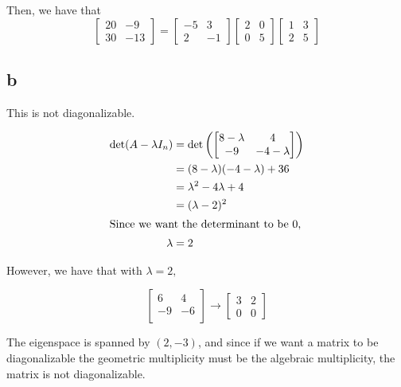 \documentclass[12pt,letterpaper]{article}
\theoremstyle{definition}
\begin{document}
Then, we have that
\[
  \begin{bmatrix}
    20 & -9 \\
    30 & -13
  \end{bmatrix} =
  \begin{bmatrix}
    -5 & 3 \\
    2 & -1 
  \end{bmatrix}
  \begin{bmatrix}
    2 & 0 \\
    0 & 5 
  \end{bmatrix}
  \begin{bmatrix}
    1 & 3 \\
    2 & 5
  \end{bmatrix}
\]

\subsection*{b}

This is not diagonalizable.

\begin{align*}
  \det(A - \lambda I_n) &= \det
                          \left(\begin{bmatrix}
                              8 - \lambda & 4 \\
                             -9 & -4 - \lambda \\
                            \end{bmatrix}\right) \\
                        &= (8 - \lambda)(-4 - \lambda) + 36 \\
                        &= \lambda^2 - 4\lambda + 4 \\
                        &= (\lambda - 2)^2 \\
  \intertext{Since we want the determinant to be 0,}
  \lambda &= 2
\end{align*}

However, we have that with $\lambda = 2,$

\[
  \begin{bmatrix}
    6 & 4 \\
    -9 & -6 \\
  \end{bmatrix} \rightarrow
  \begin{bmatrix}
    3 & 2 \\
    0 & 0 
  \end{bmatrix}
\]

The eigenspace is spanned by $(2, -3)$, and since if we want a matrix to be
diagonalizable the geometric multiplicity must be the algebraic multiplicity,
the matrix is not diagonalizable.
\end{document}
